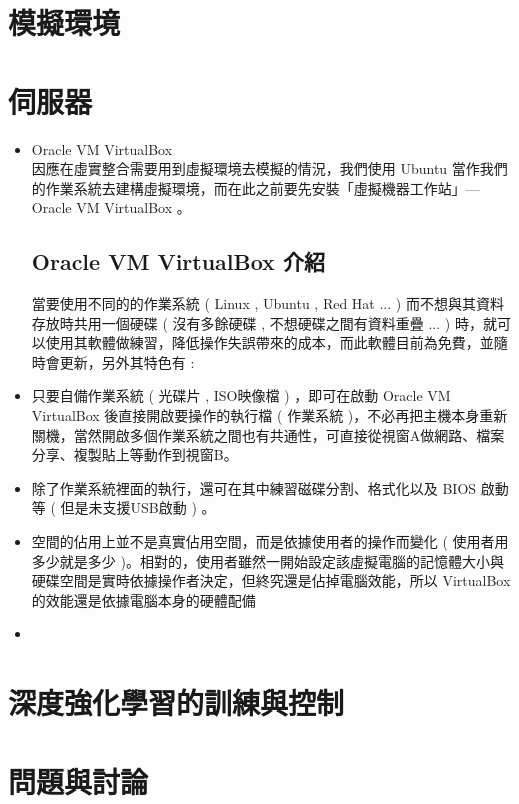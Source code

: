 \documentclass[14pt,a4paper]{report}  %
\begin{document}
\newpage
\chapter{模擬環境}
\newpage
\chapter{伺服器}
\begin{itemize}
\item Oracle VM VirtualBox\\
\qquad 因應在虛實整合需要用到虛擬環境去模擬的情況，我們使用 Ubuntu 當作我們的作業系統去建構虛擬環境，而在此之前要先安裝「虛擬機器工作站」— Oracle VM VirtualBox 。
\section{Oracle VM VirtualBox 介紹}
當要使用不同的的作業系統 ( Linux , Ubuntu , Red Hat ...  ) 而不想與其資料存放時共用一個硬碟 ( 沒有多餘硬碟 , 不想硬碟之間有資料重疊 ... ) 時，就可以使用其軟體做練習，降低操作失誤帶來的成本，而此軟體目前為免費，並隨時會更新，另外其特色有 :
\item 只要自備作業系統 ( 光碟片 , ISO映像檔 ) ，即可在啟動 Oracle VM VirtualBox  後直接開啟要操作的執行檔 ( 作業系統 )，不必再把主機本身重新關機，當然開啟多個作業系統之間也有共通性，可直接從視窗A做網路、檔案分享、複製貼上等動作到視窗B。
\item 除了作業系統裡面的執行，還可在其中練習磁碟分割、格式化以及 BIOS 啟動等 ( 但是未支援USB啟動 ) 。
\item 空間的佔用上並不是真實佔用空間，而是依據使用者的操作而變化 ( 使用者用多少就是多少 )。相對的，使用者雖然一開始設定該虛擬電腦的記憶體大小與硬碟空間是實時依據操作者決定，但終究還是佔掉電腦效能，所以 VirtualBox 的效能還是依據電腦本身的硬體配備
\item
\end{itemize}
\newpage
\chapter{深度強化學習的訓練與控制}
\newpage
\chapter{問題與討論}
\end{document}
